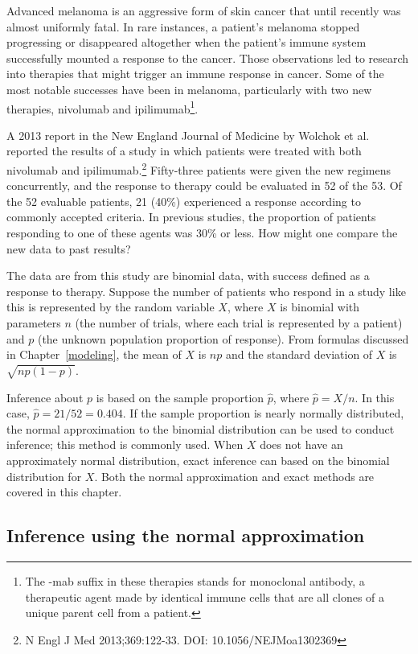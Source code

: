 Advanced melanoma is an aggressive form of skin cancer that until recently was almost uniformly fatal.  In rare instances, a patient's melanoma stopped progressing or disappeared altogether when the patient's immune system successfully mounted a response to the cancer. Those observations led to research into therapies that might trigger an immune response in cancer.  Some of the most notable successes have been in melanoma, particularly with two new therapies, nivolumab and ipilimumab\footnote{The -mab suffix in these therapies stands for monoclonal antibody, a therapeutic agent made by identical immune cells that are all clones of a unique parent cell from a patient.}.

A 2013 report in the New England Journal of Medicine by Wolchok et al. reported the results of a study in which patients were treated with both nivolumab and ipilimumab.\footnote{N Engl J Med 2013;369:122-33. DOI: 10.1056/NEJMoa1302369}   Fifty-three patients were given the new regimens concurrently, and the response to therapy could be evaluated in 52 of the 53.  Of the 52 evaluable patients, 21 (40\%) experienced a response according to commonly accepted criteria.  In previous studies, the proportion of patients responding to one of these agents was 30\% or less.  How might one compare the new data to past results?

The data are from this study are binomial data, with success defined as a response to therapy. Suppose the number of patients who respond in a study like this is represented by the random variable $X$, where $X$ is binomial with parameters $n$ (the number of trials, where each trial is represented by a patient) and $p$ (the unknown population proportion of response). From formulas discussed in Chapter~\ref{modeling}, the mean of $X$ is $np$ and the standard deviation of $X$ is $\sqrt{np(1-p)}$.

Inference about $p$ is based on the sample proportion $\hat{p}$, where $\hat{p} = X/n$. In this case, $\hat{p} = 21/52 = 0.404$. If the sample proportion is nearly normally distributed, the normal approximation to the binomial distribution can be used to conduct inference; this method is commonly used.  When $X$ does not have an approximately normal distribution, exact inference can  based on the binomial distribution for $X$.  Both the normal approximation and exact methods are covered in this chapter.

\subsection{Inference using the normal approximation}

